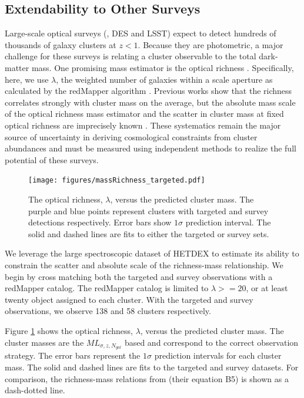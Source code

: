 \documentclass[fleqn,usenatbib]{mnras}
\begin{document}
\subsection{Extendability to Other Surveys}
Large-scale optical surveys (\eg, DES and LSST) expect to detect hundreds of thousands of galaxy clusters at $z < 1$. Because they are photometric, a major challenge for these surveys is relating a cluster observable to the total dark-matter mass. One promising mass estimator is the optical richness . Specifically, here, we use $\lambda$, the weighted number of galaxies within a scale aperture  as calculated by the redMapper algorithm \citep{Rykoff2012}. Previous works  show that the richness correlates strongly with cluster mass on the average, but the absolute mass scale of the optical richness mass estimator and the scatter in cluster mass at fixed optical richness are imprecisely known \citep{Rykoff2012}. These systematics remain the major source of uncertainty in deriving cosmological constraints from cluster abundances and must be measured using independent methods to realize the full potential of these surveys.

\begin{figure} 
	\texttt{[image: figures/massRichness\_targeted.pdf]} 
	\caption{The optical richness, $\lambda$, versus the predicted cluster mass. The purple and blue points represent clusters with targeted and survey detections respectively. Error bars show $1\sigma$ prediction interval. The solid and dashed lines are fits to either the targeted or survey sets. } \label{fig:mass richness} 
\end{figure}

We leverage the large spectroscopic dataset of HETDEX to estimate its ability to constrain the scatter and absolute scale of the richness-mass relationship. We begin by cross matching both the targeted and survey observations with a redMapper catalog. The redMapper catalog is limited to $\lambda >= 20$, or at least twenty object assigned to each cluster. With the targeted and survey observations, we observe 138 and 58 clusters respectively. 

Figure \ref{fig:mass richness} shows the optical richness, $\lambda$, versus the predicted cluster mass. The cluster masses are the $ML_{\sigma, z, N_{gal}}$ based and correspond to the correct observation strategy. The error bars represent the $1\sigma$ prediction intervals for each cluster mass. The solid and dashed lines are fits to the targeted and survey datasets. For comparison, the richness-mass relations from \cite{Rykoff2012} (their equation B5) is shown as a dash-dotted line.
\end{document}
